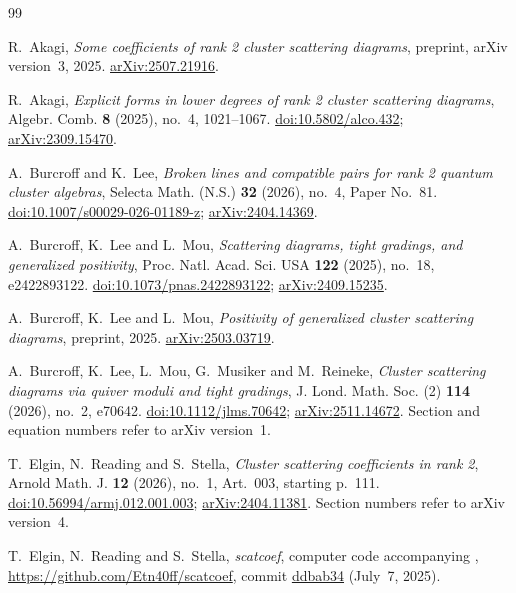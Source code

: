 \documentclass[11pt]{article}
\theoremstyle{definition}
\theoremstyle{remark}
\numberwithin{equation}{section}
\begin{document}
\begin{thebibliography}{99}

R.~Akagi,
\emph{Some coefficients of rank 2 cluster scattering diagrams},
preprint, arXiv version~3, 2025.
\href{https://arxiv.org/abs/2507.21916}{arXiv:2507.21916}.

R.~Akagi,
\emph{Explicit forms in lower degrees of rank 2 cluster scattering diagrams},
Algebr. Comb. \textbf{8} (2025), no.~4, 1021--1067.
\href{https://doi.org/10.5802/alco.432}{doi:10.5802/alco.432};
\href{https://arxiv.org/abs/2309.15470}{arXiv:2309.15470}.

A.~Burcroff and K.~Lee,
\emph{Broken lines and compatible pairs for rank 2 quantum cluster algebras},
Selecta Math. (N.S.) \textbf{32} (2026), no.~4, Paper No.~81.
\href{https://doi.org/10.1007/s00029-026-01189-z}{doi:10.1007/s00029-026-01189-z};
\href{https://arxiv.org/abs/2404.14369}{arXiv:2404.14369}.

A.~Burcroff, K.~Lee and L.~Mou,
\emph{Scattering diagrams, tight gradings, and generalized positivity},
Proc. Natl. Acad. Sci. USA \textbf{122} (2025), no.~18, e2422893122.
\href{https://doi.org/10.1073/pnas.2422893122}{doi:10.1073/pnas.2422893122};
\href{https://arxiv.org/abs/2409.15235}{arXiv:2409.15235}.

A.~Burcroff, K.~Lee and L.~Mou,
\emph{Positivity of generalized cluster scattering diagrams},
preprint, 2025.
\href{https://arxiv.org/abs/2503.03719}{arXiv:2503.03719}.

A.~Burcroff, K.~Lee, L.~Mou, G.~Musiker and M.~Reineke,
\emph{Cluster scattering diagrams via quiver moduli and tight gradings},
J. Lond. Math. Soc. (2) \textbf{114} (2026), no.~2, e70642.
\href{https://doi.org/10.1112/jlms.70642}{doi:10.1112/jlms.70642};
\href{https://arxiv.org/abs/2511.14672}{arXiv:2511.14672}.
Section and equation numbers refer to arXiv version~1.

T.~Elgin, N.~Reading and S.~Stella,
\emph{Cluster scattering coefficients in rank 2},
Arnold Math. J. \textbf{12} (2026), no.~1, Art.~003, starting p.~111.
\href{https://doi.org/10.56994/armj.012.001.003}{doi:10.56994/armj.012.001.003};
\href{https://arxiv.org/abs/2404.11381}{arXiv:2404.11381}.
Section numbers refer to arXiv version~4.

T.~Elgin, N.~Reading and S.~Stella,
\emph{scatcoef}, computer code accompanying \cite{ERS},
\url{https://github.com/Etn40ff/scatcoef}, commit
\href{https://github.com/Etn40ff/scatcoef/tree/ddbab34b41904c2d296fe943e7d45e9c2ca25f65}{ddbab34}
(July~7, 2025).


\end{thebibliography}
\end{document}
